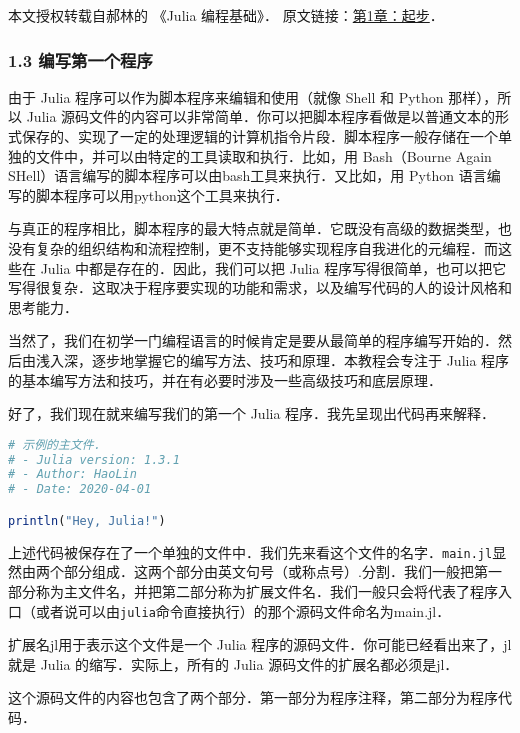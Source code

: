 
本文授权转载自郝林的 《Julia 编程基础》． 原文链接：\href{https://github.com/hyper0x/JuliaBasics/blob/master/book/ch01.md}{第1章：起步}．


\subsubsection{1.3 编写第一个程序}

由于 Julia 程序可以作为脚本程序来编辑和使用（就像 Shell 和 Python 那样），所以 Julia 源码文件的内容可以非常简单．你可以把脚本程序看做是以普通文本的形式保存的、实现了一定的处理逻辑的计算机指令片段．脚本程序一般存储在一个单独的文件中，并可以由特定的工具读取和执行．比如，用 Bash（Bourne Again SHell）语言编写的脚本程序可以由bash工具来执行．又比如，用 Python 语言编写的脚本程序可以用python这个工具来执行．

与真正的程序相比，脚本程序的最大特点就是简单．它既没有高级的数据类型，也没有复杂的组织结构和流程控制，更不支持能够实现程序自我进化的元编程．而这些在 Julia 中都是存在的．因此，我们可以把 Julia 程序写得很简单，也可以把它写得很复杂．这取决于程序要实现的功能和需求，以及编写代码的人的设计风格和思考能力．

当然了，我们在初学一门编程语言的时候肯定是要从最简单的程序编写开始的．然后由浅入深，逐步地掌握它的编写方法、技巧和原理．本教程会专注于 Julia 程序的基本编写方法和技巧，并在有必要时涉及一些高级技巧和底层原理．

好了，我们现在就来编写我们的第一个 Julia 程序．我先呈现出代码再来解释．

\begin{lstlisting}[language=julia]
# 示例的主文件．
# - Julia version: 1.3.1
# - Author: HaoLin
# - Date: 2020-04-01

println("Hey, Julia!")
\end{lstlisting}

上述代码被保存在了一个单独的文件中．我们先来看这个文件的名字．\verb|main.jl|显然由两个部分组成．这两个部分由英文句号（或称点号）.分割．我们一般把第一部分称为主文件名，并把第二部分称为扩展文件名．我们一般只会将代表了程序入口（或者说可以由\verb|julia|命令直接执行）的那个源码文件命名为main.jl．

扩展名jl用于表示这个文件是一个 Julia 程序的源码文件．你可能已经看出来了，jl就是 Julia 的缩写．实际上，所有的 Julia 源码文件的扩展名都必须是jl．

这个源码文件的内容也包含了两个部分．第一部分为程序注释，第二部分为程序代码．


